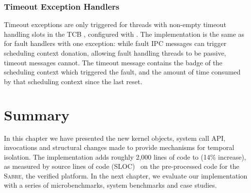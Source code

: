 \subsubsection{Timeout Exception Handlers}

Timeout exceptions are only triggered for threads with non-empty timeout handling slots in the
\gls{TCB} \cnode, configured with \tcbsettimeoutep. The implementation is the same as for
fault handlers with one exception: while fault \gls{IPC} messages can trigger scheduling context
donation, allowing fault handling threads to be passive, timeout messages cannot. The timeout
message contains the badge of the scheduling context which triggered the fault, and the amount of
time consumed by that scheduling context since the last reset.

\section{Summary}

In this chapter we have presented the new kernel objects, system call API, invocations and 
structural changes made to provide mechanisms for temporal isolation. 
The implementation adds roughly 2,000 lines of code to \selfour (14\% increase), as measured
by source lines of code (SLOC)~\citep{Wheeler_01} on the pre-processed code for the \textsc{Sabre}, the verified platform.
In the next chapter, we evaluate our implementation with a series of microbenchmarks, 
system benchmarks and case studies.


